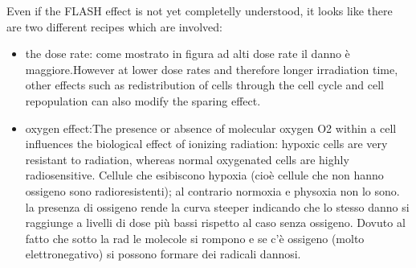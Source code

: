         Even if the FLASH effect is not yet completelly understood, it looks like there are two different recipes which are involved:
        \begin{itemize}
            \item the dose rate: come mostrato in figura ad alti dose rate il danno è maggiore.However at lower dose rates and therefore
            longer irradiation time, other effects such as redistribution of cells through the
            cell cycle and cell repopulation can also modify the sparing effect.
            \item oxygen effect:The presence or absence of molecular oxygen O2 within a cell influences
            the biological effect of ionizing radiation: hypoxic cells are very resistant to
            radiation, whereas normal oxygenated cells are highly radiosensitive.
            Cellule che esibiscono hypoxia (cioè cellule che non hanno ossigeno sono radioresistenti); al contrario normoxia e physoxia non lo sono.
            la presenza di ossigeno rende la curva steeper indicando che lo stesso danno si raggiunge a livelli di dose più bassi rispetto al caso senza ossigeno. Dovuto al fatto che sotto la rad le molecole si rompono e se c'è ossigeno (molto elettronegativo) si possono formare dei radicali dannosi.  
        \end{itemize}    
